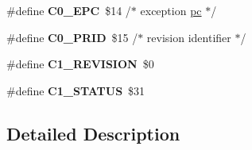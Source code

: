 \begin{DoxyCompactItemize}
\#define {\bfseries C0\+\_\+\+E\+PC}~\$14		/$\ast$ exception \mbox{\hyperlink{group__mips__regs_ga2f03b14a71de24f7c904d4ce6d26d7f5}{pc}} $\ast$/
\item 
\mbox{\label{group__RTEMSScoreMIPSSet__idtcpu_ga5e0934a901aa42ee96a3deb2dc96bd39}} 
\#define {\bfseries C0\+\_\+\+P\+R\+ID}~\$15		/$\ast$ revision identifier $\ast$/
\item 
\mbox{\label{group__RTEMSScoreMIPSSet__idtcpu_gac016bc433572684f4146f27e2cd416e2}} 
\#define {\bfseries C1\+\_\+\+R\+E\+V\+I\+S\+I\+ON}~\$0
\item 
\mbox{\label{group__RTEMSScoreMIPSSet__idtcpu_ga2cc90164b3bb90eff1dea40847e7914b}} 
\#define {\bfseries C1\+\_\+\+S\+T\+A\+T\+US}~\$31
\end{DoxyCompactItemize}


\subsection{Detailed Description}
